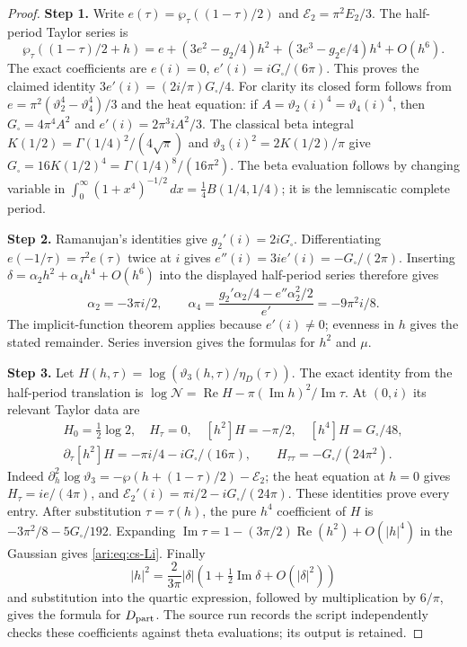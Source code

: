 \begin{proof}
\noindent\textbf{Step 1.} Write $e(\tau)=\wp_\tau((1-\tau)/2)$ and
$\mathcal E_2=\pi^2E_2/3$. The half-period Taylor series is
\[
 \wp_\tau((1-\tau)/2+h)
 =e+(3e^2-g_2/4)h^2+(3e^3-g_2e/4)h^4+O(h^6).
\]
The exact coefficients are
$e(i)=0$, $e'(i)=iG_\square/(6\pi)$. This proves the claimed identity
$3e'(i)=(2i/\pi)G_\square/4$. For clarity its closed form follows from
$e=\pi^2(\vartheta_2^4-\vartheta_4^4)/3$ and the heat equation:
if $A=\vartheta_2(i)^4=\vartheta_4(i)^4$, then
$G_\square=4\pi^4A^2$ and $e'(i)=2\pi^3iA^2/3$.
The classical beta integral
$K(1/2)=\Gamma(1/4)^2/(4\sqrt\pi)$ and
$\vartheta_3(i)^2=2K(1/2)/\pi$ give
$G_\square=16K(1/2)^4=\Gamma(1/4)^8/(16\pi^2)$.
The beta evaluation follows by changing variable in
$\int_0^\infty(1+x^4)^{-1/2}\,dx
=\tfrac14 B(1/4,1/4)$; it is the lemniscatic complete period.


\noindent\textbf{Step 2.} Ramanujan's identities give $g_2'(i)=2iG_\square$. Differentiating
$e(-1/\tau)=\tau^2 e(\tau)$ twice at $i$ gives
$e''(i)=3i e'(i)=-G_\square/(2\pi)$. Inserting
$\delta=\alpha_2h^2+\alpha_4h^4+O(h^6)$ into the displayed half-period series
therefore gives
\[
 \alpha_2=-3\pi i/2,\qquad
 \alpha_4=\frac{g_2'\alpha_2/4-e''\alpha_2^2/2}{e'}=-9\pi^2i/8.
\]
The implicit-function theorem applies because $e'(i)\ne0$;
evenness in $h$ gives the stated remainder. Series inversion gives
the formulas for $h^2$ and $\mu$.


\noindent\textbf{Step 3.} Let $H(h,\tau)=\log(\vartheta_3(h,\tau)/\eta_D(\tau))$. The exact
identity from the half-period translation is
$\log \mathcal N=\operatorname{Re}H-\pi(\operatorname{Im}h)^2/
\operatorname{Im}\tau$. At $(0,i)$ its relevant Taylor data are
\[
 \begin{gathered}
 H_0=\tfrac12\log2,\quad H_\tau=0,\quad
 [h^2]H=-\pi/2,\quad [h^4]H=G_\square/48,\\
 \partial_\tau[h^2]H=-\pi i/4-iG_\square/(16\pi),\qquad
 H_{\tau\tau}=-G_\square/(24\pi^2).
 \end{gathered}
\]
Indeed $\partial_h^2\log\vartheta_3=-\wp(h+(1-\tau)/2)-\mathcal E_2$;
the heat equation at $h=0$ gives $H_\tau=ie/(4\pi)$, and
$\mathcal E_2'(i)=\pi i/2-iG_\square/(24\pi)$. These identities prove every entry.
After substitution $\tau=\tau(h)$, the pure $h^4$ coefficient of
$H$ is $-3\pi^2/8-5G_\square/192$. Expanding
$\operatorname{Im}\tau=1-(3\pi/2)\operatorname{Re}(h^2)+O(|h|^4)$
in the Gaussian gives \eqref{ari:eq:cs-Li}. Finally
\[
 |h|^2=\frac{2}{3\pi}|\delta|
          \left(1+\tfrac12\operatorname{Im}\delta+O(|\delta|^2)\right)
\]
and substitution into the quartic expression, followed by
multiplication by $6/\pi$, gives the formula for $D_{\rm part}$.
The source run records the script  independently checks
these coefficients against theta evaluations; its output is retained.
\end{proof}

